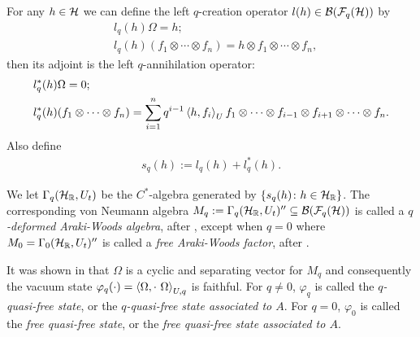 For any $h\in \mathcal H$ we can define the left $q$-creation operator $l(h)\in \mathcal B(\mathcal{F}_q(\mathcal H))$ by
	\begin{align*}
		&l_q(h)\Omega=h;\\
		&l_q(h)(f_1\otimes\cdots\otimes f_n)=h\otimes f_1\otimes\cdots \otimes f_n,
	\end{align*}
then its adjoint is the left $q$-annihilation operator:
	\begin{align*}
		&l_q^*(h)\Omega=0;\\
		&l_q^*(h)(f_1\otimes\cdots\otimes f_n)= \sum_{i=1}^n q^{i-1} \left\langle h,f_i\right\rangle_U f_1\otimes \cdots \otimes f_{i-1}\otimes f_{i+1}\otimes\cdots \otimes f_n.
	\end{align*}
Also define
	\begin{align*}
		s_q(h):=l_q(h)+l_q^*(h).
	\end{align*}\par
We let $\Gamma_q(\mathcal H_{\mathbb{R}},U_t)$ be the $C^*$-algebra generated by $\{s_q(h)\colon h\in\mathcal H_{\mathbb{R}}\}$. The corresponding von Neumann algebra $M_q:=\Gamma_q(\mathcal H_{\mathbb{R}},U_t)''\subseteq \mathcal B(\mathcal{F}_q(\mathcal H))$ is called a \emph{$q$-deformed Araki-Woods algebra}, after \cite{Hia03}, except when $q=0$ where $M_0=\Gamma_0(\mathcal H_{\mathbb{R}},U_t)''$ is called a \emph{free Araki-Woods factor}, after \cite{Shl97}.\par
It was shown in \cite{Hia03} that $\Omega$ is a cyclic and separating vector for $M_q$ and consequently the vacuum state $\varphi_q(\cdot)=\left\langle\Omega,\cdot\  \Omega\right\rangle_{U,q}$ is faithful. For $q\neq 0$, $\varphi_q$ is called the \emph{$q$-quasi-free state}, or the \emph{$q$-quasi-free state associated to $A$}. For $q=0$, $\varphi_0$ is called the \emph{free quasi-free state}, or the \emph{free quasi-free state associated to $A$}.\par

